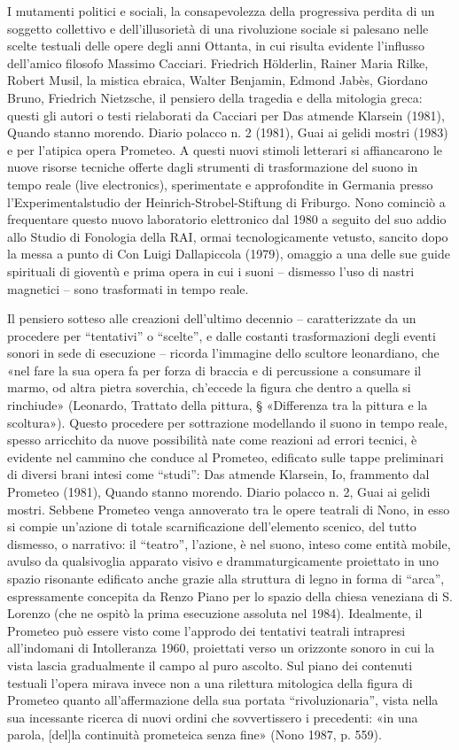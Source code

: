 I mutamenti politici e sociali, la consapevolezza della progressiva perdita di un soggetto collettivo e dell’illusorietà di una rivoluzione sociale si palesano nelle scelte testuali delle opere degli anni Ottanta, in cui risulta evidente l’influsso dell’amico filosofo Massimo Cacciari. Friedrich Hölderlin, Rainer Maria Rilke, Robert Musil, la mistica ebraica, Walter Benjamin, Edmond Jabès, Giordano Bruno, Friedrich Nietzsche, il pensiero della tragedia e della mitologia greca: questi gli autori o testi rielaborati da Cacciari per Das atmende Klarsein (1981), Quando stanno morendo. Diario polacco n. 2 (1981), Guai ai gelidi mostri (1983) e per l’atipica opera Prometeo. A questi nuovi stimoli letterari si affiancarono le nuove risorse tecniche offerte dagli strumenti di trasformazione del suono in tempo reale (live electronics), sperimentate e approfondite in Germania presso l’Experimentalstudio der Heinrich-Strobel-Stiftung di Friburgo. Nono cominciò a frequentare questo nuovo laboratorio elettronico dal 1980 a seguito del suo addio allo Studio di Fonologia della RAI, ormai tecnologicamente vetusto, sancito dopo la messa a punto di Con Luigi Dallapiccola (1979), omaggio a una delle sue guide spirituali di gioventù e prima opera in cui i suoni – dismesso l’uso di nastri magnetici – sono trasformati in tempo reale.

Il pensiero sotteso alle creazioni dell’ultimo decennio – caratterizzate da un procedere per “tentativi” o “scelte”, e dalle costanti trasformazioni degli eventi sonori in sede di esecuzione – ricorda l’immagine dello scultore leonardiano, che «nel fare la sua opera fa per forza di braccia e di percussione a consumare il marmo, od altra pietra soverchia, ch’eccede la figura che dentro a quella si rinchiude» (Leonardo, Trattato della pittura, § «Differenza tra la pittura e la scoltura»). Questo procedere per sottrazione modellando il suono in tempo reale, spesso arricchito da nuove possibilità nate come reazioni ad errori tecnici, è evidente nel cammino che conduce al Prometeo, edificato sulle tappe preliminari di diversi brani intesi come “studi”: Das atmende Klarsein, Io, frammento dal Prometeo (1981), Quando stanno morendo. Diario polacco n. 2, Guai ai gelidi mostri. Sebbene Prometeo venga annoverato tra le opere teatrali di Nono, in esso si compie un’azione di totale scarnificazione dell’elemento scenico, del tutto dismesso, o narrativo: il “teatro”, l’azione, è nel suono, inteso come entità mobile, avulso da qualsivoglia apparato visivo e drammaturgicamente proiettato in uno spazio risonante edificato anche grazie alla struttura di legno in forma di “arca”, espressamente concepita da Renzo Piano per lo spazio della chiesa veneziana di S. Lorenzo (che ne ospitò la prima esecuzione assoluta nel 1984). Idealmente, il Prometeo può essere visto come l’approdo dei tentativi teatrali intrapresi all’indomani di Intolleranza 1960, proiettati verso un orizzonte sonoro in cui la vista lascia gradualmente il campo al puro ascolto. Sul piano dei contenuti testuali l’opera mirava invece non a una rilettura mitologica della figura di Prometeo quanto all’affermazione della sua portata “rivoluzionaria”, vista nella sua incessante ricerca di nuovi ordini che sovvertissero i precedenti: «in una parola, [del]la continuità prometeica senza fine» (Nono 1987, p. 559).

